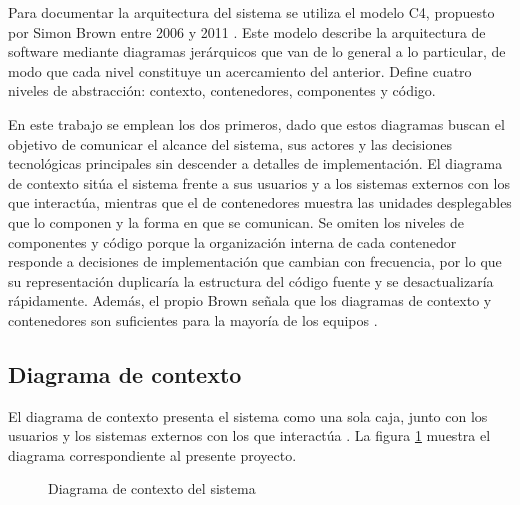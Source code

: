 Para documentar la arquitectura del sistema se utiliza el modelo C4, propuesto por Simon Brown entre 2006 y 2011 \cite{simon_brown_history}. Este modelo describe la arquitectura de software mediante diagramas jerárquicos que van de lo general a lo particular, de modo que cada nivel constituye un acercamiento del anterior. Define cuatro niveles de abstracción: contexto, contenedores, componentes y código\cite{brown_software_architecture}. 

En este trabajo se emplean los dos primeros, dado que estos diagramas buscan el objetivo de comunicar el alcance del sistema, sus actores y las decisiones tecnológicas principales sin descender a detalles de implementación. El diagrama de contexto sitúa el sistema frente a sus usuarios y a los sistemas externos con los que interactúa, mientras que el de contenedores muestra las unidades desplegables que lo componen y la forma en que se comunican. Se omiten los niveles de componentes y código porque la organización interna de cada contenedor responde a decisiones de implementación que cambian con frecuencia, por lo que su representación duplicaría la estructura del código fuente y se desactualizaría rápidamente. Además, el propio Brown señala que los diagramas de contexto y contenedores son suficientes para la mayoría de los equipos \cite{brown_software_architecture}.


\subsection{Diagrama de contexto}
El diagrama de contexto presenta el sistema como una sola caja, junto con los usuarios y los sistemas externos con los que interactúa \cite{brown_software_architecture}. La figura \ref{fig:diagrama_contexto} muestra el diagrama correspondiente al presente proyecto.

\begin{figure}
    \centering
    
    \caption{Diagrama de contexto del sistema}
    \label{fig:diagrama_contexto}
\end{figure}

